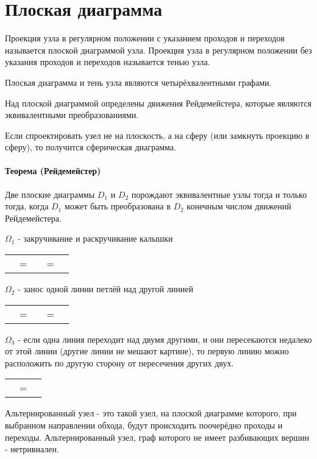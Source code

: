 \section{Плоская диаграмма}

Проекция узла в регулярном положении с указанием проходов и переходов называется плоской диаграммой узла.
Проекция узла в регулярном положении без указания проходов и переходов называется тенью узла. 

Плоская диаграмма и тень узла являются четырёхвалентными графами.

Над плоской диаграммой определены движения Рейдемейстера, которые являются эквивалентными преобразованиями.

Если спроектировать узел не на плоскость, а на сферу (или замкнуть проекцию в сферу), то получится сферическая диаграмма.

\paragraph{Теорема (Рейдемейстер)} Две плоские диаграммы $D_1$ и $D_2$ порождают эквивалентные узлы тогда и только тогда, когда $D_1$ может быть преобразована в $D_2$ конечным числом движений Рейдемейстера.



\graphicspath{{\currentpath}}

$\Omega_1$ - закручивание и раскручивание калышки

\begin{tabular}{
>{\centering\arraybackslash}m{3cm}>{\centering\arraybackslash}m{0.4cm}
>{\centering\arraybackslash}m{3cm}>{\centering\arraybackslash}m{0.4cm}
>{\centering\arraybackslash}m{3cm}
}

&
=
&

&
=
&

\end{tabular}

$\Omega_2$ - занос одной линии петлёй над другой линией

\begin{tabular}{
>{\centering\arraybackslash}m{3cm}>{\centering\arraybackslash}m{0.4cm}
>{\centering\arraybackslash}m{3cm}>{\centering\arraybackslash}m{0.4cm}
>{\centering\arraybackslash}m{3cm}
}

&
=
&

&
=
&

\end{tabular}


$\Omega_3$ - если одна линия переходит над двумя другими, и они пересекаются недалеко от этой линии (другие линии не мешают картине), то первую линию можно расположить по другую сторону от пересечения других двух.

\begin{tabular}{
>{\centering\arraybackslash}m{3cm}>{\centering\arraybackslash}m{0.4cm}
>{\centering\arraybackslash}m{3cm}
}

&
=
&


\end{tabular}

Альтернированный узел - это такой узел, на плоской диаграмме которого, при выбранном направлении обхода, будут происходить поочерёдно проходы и переходы.
Альтернированный узел, граф которого не имеет разбивающих вершин - нетривиален.

